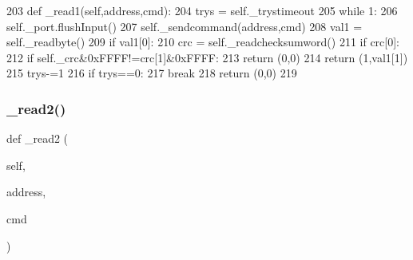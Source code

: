 \begin{DoxyCode}
203     \textcolor{keyword}{def }\_read1(self,address,cmd):
204         trys = self.\_trystimeout
205         \textcolor{keywordflow}{while} 1:
206             self.\_port.flushInput()
207             self.\_sendcommand(address,cmd)
208             val1 = self.\_readbyte()
209             \textcolor{keywordflow}{if} val1[0]:
210                 crc = self.\_readchecksumword()
211                 \textcolor{keywordflow}{if} crc[0]:
212                     \textcolor{keywordflow}{if} self.\_crc&0xFFFF!=crc[1]&0xFFFF:
213                         \textcolor{keywordflow}{return} (0,0)
214                     \textcolor{keywordflow}{return} (1,val1[1])
215             trys-=1
216             \textcolor{keywordflow}{if} trys==0:
217                 \textcolor{keywordflow}{break}
218         \textcolor{keywordflow}{return} (0,0)
219 
\end{DoxyCode}
\mbox{\label{classtoxic__hardware_1_1roboclaw__3_1_1Roboclaw_a865ec63bfaf45dc74af6fc1738d86551}} 
\subsubsection{\texorpdfstring{\+\_\+read2()}{\_read2()}}
{\footnotesize\ttfamily def \+\_\+read2 (\begin{DoxyParamCaption}\item[{}]{self,  }\item[{}]{address,  }\item[{}]{cmd }\end{DoxyParamCaption})\hspace{0.3cm}{\ttfamily [private]}}


